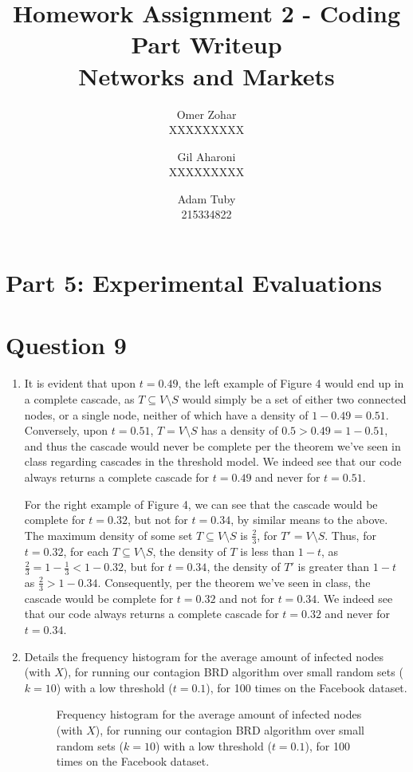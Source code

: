 \documentclass{article}
\title{
    Homework Assignment 2 - Coding Part Writeup\\
    Networks and Markets
}
\author{
    Omer Zohar\\XXXXXXXXX
    \and
    Gil Aharoni\\XXXXXXXXX
    \and
    Adam Tuby\\215334822
}
\begin{document}
\maketitle

\section*{Part 5: Experimental Evaluations}
\setcounter{section}{0}

\section{Question 9}

\begin{enumerate}[label=(\alph*)]
    \item It is evident that upon $t = 0.49$, the left example of Figure 4 would end up in a complete cascade, as $T \subseteq V \setminus S$ would simply be a set of either two connected nodes, or a single node, neither of which have a density of $1 - 0.49 = 0.51$. Conversely, upon $t = 0.51$, $T = V \setminus S$ has a density of $0.5 > 0.49 = 1 - 0.51$, and thus the cascade would never be complete per the theorem we've seen in class regarding cascades in the threshold model. We indeed see that our code always returns a complete cascade for $t = 0.49$ and never for $t = 0.51$.
    
    For the right example of Figure 4, we can see that the cascade would be complete for $t = 0.32$, but not for $t = 0.34$, by similar means to the above. The maximum density of some set $T \subseteq V \setminus S$ is $\frac{2}{3}$, for $T' = V \setminus S$. Thus, for $t = 0.32$, for each $T \subseteq V \setminus S$, the density of $T$ is less than $1 - t$, as $\frac{2}{3} = 1 - \frac{1}{3} < 1 - 0.32$, but for $t = 0.34$, the density of $T'$ is greater than $1 - t$ as $\frac{2}{3} > 1 - 0.34$. Consequently, per the theorem we've seen in class, the cascade would be complete for $t = 0.32$ and not for $t = 0.34$. We indeed see that our code always returns a complete cascade for $t = 0.32$ and never for $t = 0.34$.
    
    \item {} Details the frequency histogram for the average amount of infected nodes (with $X$), for running our contagion BRD algorithm over small random sets ($k = 10$) with a low threshold ($t = 0.1$), for 100 times on the Facebook dataset.
    
    \begin{figure*}[h]
        \centering
        \resizebox{0.6\textwidth}{!}{
            
        }
        \caption{Frequency histogram for the average amount of infected nodes (with $X$), for running our contagion BRD algorithm over small random sets ($k = 10$) with a low threshold ($t = 0.1$), for 100 times on the Facebook dataset.}
        \label{fig:q9b}
    \end{figure*}


\end{enumerate}
\end{document}
